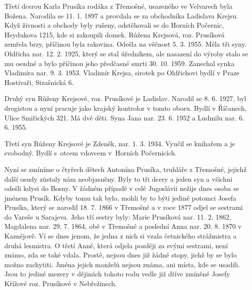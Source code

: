 \documentclass[../dejiny-rodu-prusiku.tex]{subfiles}
\begin{document}
Třetí dcerou Karla Prusíka rodáka z Třemošné, usazeného ve Velvarech byla Božena. Narodila se 11. 1. 1897 a provdala se za obchodníka Ladislava Krejsu. Když živnosti a obchody byly rušeny, odstěhovali se do Horních Počernic, Heydukova 1215, kde si zakoupili domek. Růžena Krejsová, roz. Prusíková zemřela brzy, příčinou byla rakovina. Odešla na věčnost 5. 3. 1955. Měla tři syny. Oldřicha nar. 12. 2. 1925, který se stal úředníkem, ale nasazení do výroby stalo se mu osudné a bylo příčinou jeho předčas­né smrti 30. 10. 1959. Zanechal synka Vladimíra nar. 9. 3. 1953.
Vladimír Krejsa, sirotek po Oldřichovi bydlí v Praze Hostivaři, Strašnická 6.

Druhý syn Růženy Krejsové, roz. Prusíkové je Ladislav. Narodil se 8. 6. 1927, byl drogistou a nyní pracuje jako krajský kontrolor v tomto oboru. Bydlí v Říčanech, Ulice Smiřických 321. Má dvě děti. Syna Jana nar. 23. 6. 1952 a Ludmilu nar. 6. 6. 1955.

Třetí syn Růženy Krejsové je Zdeněk, nar. 1. 3. 1934. Vyučil se knihařem a je svobodný. Bydlí s otcem vdovcem v Horních Počernicích.

Nyní se zmíníme o čtyřech dětech Antonína Prusíka, truhláře z Třemošné, jejichž další osudy zůstaly nám neobjasněny. Byly to tři dcery a jeden syn a všichni odešli kdysi do Bosny. V žádném případě v celé Jugoslávii nežije dnes osoba se jménem Prusík. Kdyby to­mu tak bylo, mohli by to býti jedině potomci Josefa Prusíka, který se narodil 18. 7. 1866 v Třemošné a v roce 1877 odjel se sestrami do Vareše u Sarajeva. Jeho tří sestry byly: Marie Prusíková nar. 11. 2. 1862, Magdalena nar. 29. 7. 1864, obě v Třemošné a poslední Anna nar. 20. 8. 1870 v Kaznějově. Ví se dnes jenom, že jedna z nich si vzala četnického strážmistra a druhá lesmistra. O třetí Anně, která odjela později za svý­mi sestrami, není známo, zda se také vdala. Prostě, nejsou dnes již žádné stopy, jichž by se bylo možno zachytiti. Jména jejich manželů nejsou známa, ani místa, kde se usadili. Jsou to jediné mezery v dějinách to­hoto rodu vedle již dříve zmíněné Josefy Křížové roz. Prusíkové v Nebřežinech.
\end{document}
